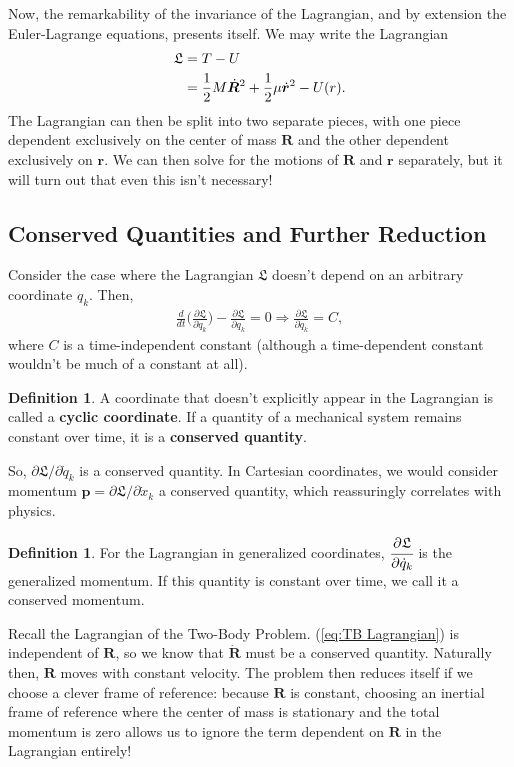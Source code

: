 \documentclass[10pt, psamsfonts]{amsart}
\theoremstyle{definition}
\newtheorem{defn}[thm]{Definition}
\theoremstyle{remark}
\numberwithin{equation}{section}
\begin{document}
Now, the remarkability of the invariance of the Lagrangian, and by extension the Euler-Lagrange equations, presents itself. We may write the Lagrangian
\begin{align}
  \label{eq:TB Lagrangian}
  \mathfrak{L} &= T - U \notag \\
               &= \frac{1}{2} M \dot{\bm{R}}^2 + \frac{1}{2} \mu\dot{\bm{r}}^2 - U(r). 
\end{align}
The Lagrangian can then be split into two separate pieces, with one piece dependent exclusively on the center of mass $\bm{R}$ and the other dependent exclusively on $\bm{r}$. We can then solve for the motions of $\bm{R}$ and $\bm{r}$ separately, but it will turn out that even this isn't necessary!

\subsection{Conserved Quantities and Further Reduction}
Consider the case where the Lagrangian $\mathfrak{L}$ doesn't depend on an arbitrary coordinate ${q_k}$. Then,
\begin{align*}
  \frac{d}{dt} \bigg(\frac{\partial \mathfrak{L}}{\partial \dot{q}_k}  \bigg) - \frac{\partial \mathfrak{L}}{\partial q_k} = 0 \Rightarrow \frac{\partial \mathfrak{L}}{\partial \dot{q}_k} = C,  
\end{align*}
where $C$ is a time-independent constant (although a time-dependent constant wouldn't be much of a constant at all).
\begin{defn}
  A coordinate that doesn't explicitly appear in the Lagrangian is called a \textbf{cyclic coordinate}. If a quantity of a mechanical system remains constant over time, it is a \textbf{conserved quantity}.
\end{defn}

\noindent So, ${\partial \mathfrak{L}}/{\partial \dot{q}_k}$ is a conserved quantity. In Cartesian coordinates, we would consider momentum $\bm{p} = {\partial \mathfrak{L}}/{\partial \dot{x}_k}$ a conserved quantity, which reassuringly correlates with physics. 

\begin{defn}
For the Lagrangian in generalized coordinates,
  $\cfrac{\partial \mathfrak{L}}{\partial \dot{q}_k}$
is the generalized momentum. If this quantity is constant over time, we call it a conserved momentum.
\end{defn}

Recall the Lagrangian of the Two-Body Problem. (\ref{eq:TB Lagrangian}) is independent of $\bm{R}$, so we know that $\dot{\bm{R}}$ must be a conserved quantity. Naturally then, $\bm{R}$ moves with constant velocity. The problem then reduces itself if we choose a clever frame of reference: because $\bm{R}$ is constant, choosing an inertial frame of reference where the center of mass is stationary and the total momentum is zero allows us to ignore the term dependent on $\bm{R}$ in the Lagrangian entirely!
\end{document}
